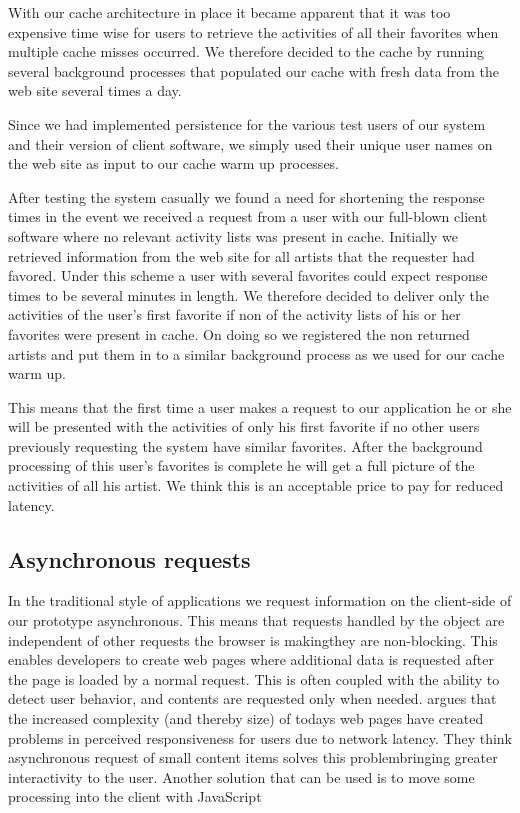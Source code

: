 With our cache architecture in place it became apparent that it was too
expensive time wise for users to retrieve the activities of all their
favorites when multiple cache misses occurred. We therefore decided to
 the cache by running several background processes that populated
our cache with fresh data from the \urort{} web site several times a day.

Since we had implemented persistence for the various test users of our system
and their version of client software, we simply used their unique user names
on the \urort{} web site as input to our cache warm up processes.

After testing the system casually we found a need for shortening the response
times in the event we received a request from a user with our full-blown
client software where no relevant activity lists
was present in cache. Initially we retrieved information from the \urort{} web
site for all artists that the requester had favored. Under this scheme a
user with several favorites could expect response times to be several minutes
in length. We therefore decided to deliver only the activities of the user's
first favorite if non of the activity lists of his or her favorites were
present in cache. On doing so we registered the non returned artists and put
them in to a similar background process as we used for our cache warm up. 

This means that the first time a user makes a request to our application he
or she will be presented with the activities of only his first favorite if no
other users previously requesting the system have similar favorites. After the
background processing of this user's favorites is complete he will get a full
picture of the activities of all his artist. We think this is an acceptable
price to pay for reduced latency.

\subsection{Asynchronous requests}

In the traditional style of  applications we request information on
the client-side of our prototype asynchronous.%
This means that requests handled by the  object
are independent of other requests the browser is making\dash{}they
are non-blocking. This enables developers to create web pages where additional
data is requested after the page is loaded by a normal  request.
This is often coupled with the ability to detect user behavior, and contents
are requested only when needed. \citet[pp.281--282]{stamey06} argues that
the increased complexity (and thereby size) of todays web pages have created
problems in perceived responsiveness for users due to network latency. They
think asynchronous request of small content items solves this
problem\dash{}bringing greater interactivity to the user. Another solution
that can be used is to move some processing into the client with
JavaScript \citep[]{jazayeri07}

